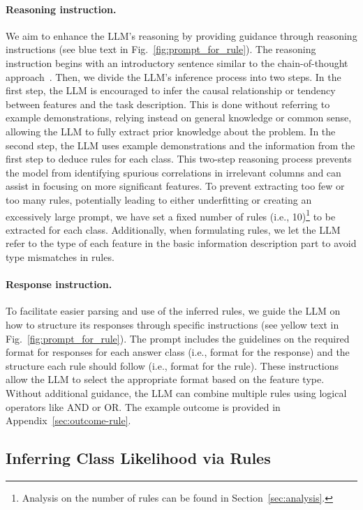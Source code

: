 \paragraph{Reasoning instruction.} We aim to enhance the LLM's reasoning by providing guidance through reasoning instructions (see blue text in Fig.~\ref{fig:prompt_for_rule}). The reasoning instruction begins with an introductory sentence similar to the chain-of-thought approach~\cite{wei2022chain}. Then, we divide the LLM's inference process into two steps. In the first step, the LLM is encouraged to infer the causal relationship or tendency between features and the task description. This is done without referring to example demonstrations, relying instead on general knowledge or common sense, allowing the LLM to fully extract prior knowledge about the problem. In the second step, the LLM uses example demonstrations and the information from the first step to deduce rules for each class. This two-step reasoning process prevents the model from identifying spurious correlations in irrelevant columns and can assist in focusing on more significant features. To prevent extracting too few or too many rules, potentially leading to either underfitting or creating an excessively large prompt, we have set a fixed number of rules (i.e., 10)\footnote{Analysis on the number of rules can be found in Section~\ref{sec:analysis}.} to be extracted for each class. Additionally, when formulating rules, we let the LLM refer to the type of each feature in the basic information description part to avoid type mismatches in rules. 

\vspace*{-0.12in}
\paragraph{Response instruction.} To facilitate easier parsing and use of the inferred rules, we guide the LLM on how to structure its responses through specific instructions (see yellow text in Fig.~\ref{fig:prompt_for_rule}). The prompt includes the guidelines on the required format for responses for each answer class (i.e., format for the response) and the structure each rule should follow (i.e., format for the rule). These instructions allow the LLM to select the appropriate format based on the feature type. Without additional guidance, the LLM can combine multiple rules using logical operators like AND or OR. The example outcome is provided in Appendix~\ref{sec:outcome-rule}. 

\subsection{Inferring Class Likelihood via Rules}
\label{Sec:training}

